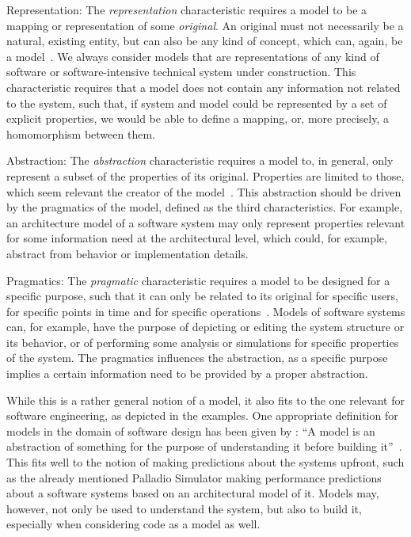 \begin{properdescription}
\item[Representation:] 
The \emph{representation} characteristic requires a model to be a mapping or representation of some \emph{original}.
An original must not necessarily be a natural, existing entity, but can also be any kind of concept, which can, again, be a model~\cite[p.~131]{stachowiak1973modelltheorie-Book}.
We always consider models that are representations of any kind of software or software-intensive technical system under construction.
This characteristic requires that a model does not contain any information not related to the system, such that, if system and model could be represented by a set of explicit properties, we would be able to define a mapping, or, more precisely, a homomorphism between them.

\item[Abstraction:] 
The \emph{abstraction} characteristic requires a model to, in general, only represent a subset of the properties of its original.
Properties are limited to those, which seem relevant the creator of the model~\cite[p.~132]{stachowiak1973modelltheorie-Book}.
This abstraction should be driven by the pragmatics of the model, defined as the third characteristics.
For example, an architecture model of a software system may only represent properties relevant for some information need at the architectural level, which could, for example, abstract from behavior or implementation details.

\item[Pragmatics:] 
The \emph{pragmatic} characteristic requires a model to be designed for a specific purpose, such that it can only be related to its original for specific users, for specific points in time and for specific operations~\cite[pp.~132]{stachowiak1973modelltheorie-Book}.
Models of software systems can, for example, have the purpose of depicting or editing the system structure or its behavior, or of performing some analysis or simulations for specific properties of the system.
The pragmatics influences the abstraction, as a specific purpose implies a certain information need to be provided by a proper abstraction.
\end{properdescription}

While this is a rather general notion of a model, it also fits to the one relevant for software engineering, as depicted in the examples.
One appropriate definition for models in the domain of software design has been given by \citeauthor{rumbaugh2005objectoriented-Book}:
\enquote{A model is an abstraction of something for the purpose of understanding it before building it}~\cite[p.~15]{rumbaugh2005objectoriented-Book}.
This fits well to the notion of making predictions about the systems upfront, such as the already mentioned Palladio Simulator making performance predictions about a software systems based on an architectural model of it.
Models may, however, not only be used to understand the system, but also to build it, especially when considering code as a model as well.


